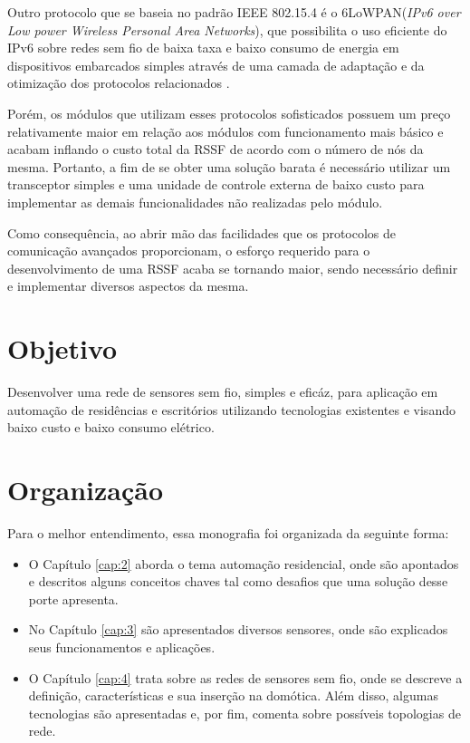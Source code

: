 Outro protocolo que se baseia no padrão IEEE 802.15.4 é o 6LoWPAN(\textit{IPv6 over Low power Wireless
Personal Area Networks}), que possibilita o uso eficiente do IPv6 sobre redes sem fio de baixa taxa e baixo
consumo de energia em dispositivos embarcados simples através de uma camada de adaptação e da otimização dos
protocolos relacionados \cite{shelby_bormann2009}.

Porém, os módulos que utilizam esses protocolos sofisticados possuem um preço relativamente maior em relação
aos módulos com funcionamento mais básico e acabam inflando o custo total da RSSF de acordo com o número de
nós da mesma. Portanto, a fim de se obter uma solução barata é necessário utilizar um transceptor simples e
uma unidade de controle externa de baixo custo para implementar as demais funcionalidades não realizadas pelo
módulo.

Como consequência, ao abrir mão das facilidades que os protocolos de comunicação avançados proporcionam, o
esforço requerido para o desenvolvimento de uma RSSF acaba se tornando maior, sendo necessário definir e
implementar diversos aspectos da mesma.

\section {Objetivo}
Desenvolver uma rede de sensores sem fio, simples e eficáz, para aplicação em automação de residências e
escritórios utilizando tecnologias existentes e visando baixo custo e baixo consumo elétrico.

\section {Organização}
Para o melhor entendimento, essa monografia foi organizada da seguinte forma:

\begin{itemize}
	\item O Capítulo \ref{cap:2} aborda o tema automação residencial, onde são apontados e descritos
	alguns conceitos chaves tal como desafios que uma solução desse porte apresenta.
	\item No Capítulo \ref{cap:3} são apresentados diversos sensores, onde são explicados seus
	funcionamentos e aplicações.
	\item O Capítulo \ref{cap:4} trata sobre as redes de sensores sem fio, onde se descreve a definição,
	características e sua inserção na domótica. Além disso, algumas tecnologias são apresentadas e,
	por fim, comenta sobre possíveis topologias de rede.
\end{itemize}
